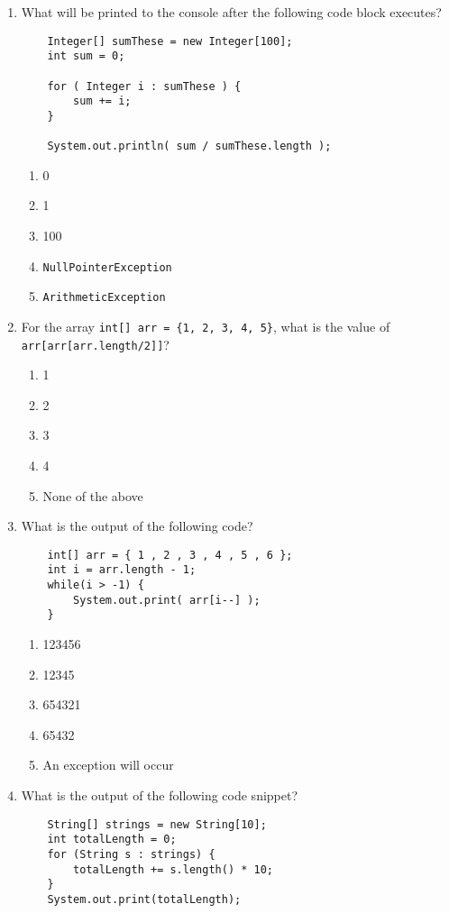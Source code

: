 \documentclass[S17-Final.tex]{subfiles}
\begin{document}
\begin{enumerate}
\item What will be printed to the console after the following code block executes?
\begin{lstlisting}
    Integer[] sumThese = new Integer[100]; 
    int sum = 0; 
    
    for ( Integer i : sumThese ) { 
        sum += i; 
    } 
    
    System.out.println( sum / sumThese.length );
\end{lstlisting}
	
\begin{enumerate}
\item  0
\item  1
\item  100
\item  \texttt{NullPointerException} \ifdraft \Ans \fi 
\item  \texttt{ArithmeticException}
\end{enumerate}

\item For the array \texttt{int[] arr = \{1, 2, 3, 4, 5\}}, what is the value of \texttt{arr[arr[arr.length/2]]}?
	
\begin{enumerate}
\item  1
\item  2
\item  3
\item  4 \ifdraft \Ans \fi 
\item  None of the above
\end{enumerate}

\item What is the output of the following code?
\begin{lstlisting}
    int[] arr = { 1 , 2 , 3 , 4 , 5 , 6 };
    int i = arr.length - 1;
    while(i > -1) {
        System.out.print( arr[i--] );
    }
\end{lstlisting}
	
\begin{enumerate}
\item  123456
\item  12345
\item  654321 \ifdraft \Ans \fi 
\item  65432
\item  An exception will occur
\end{enumerate}

\item What is the output of the following code snippet?
\begin{lstlisting}
    String[] strings = new String[10];
    int totalLength = 0;
    for (String s : strings) {
        totalLength += s.length() * 10;
    }
    System.out.print(totalLength);
\end{lstlisting}
	

\end{enumerate}
\end{document}
